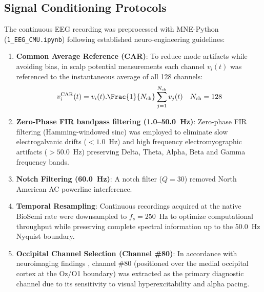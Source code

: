 \documentclass[12pt, a4paper]{report}
\begin{document}
\subsection{Signal Conditioning Protocols}
The continuous EEG recording was preprocessed with MNE-Python (\texttt{1\_EEG\_CMU.ipynb}) following established neuro-engineering guidelines:
\begin{enumerate}
    \item \textbf{Common Average Reference (CAR)}: To reduce mode artifacts while avoiding bias, in scalp potential measurements each channel $v_i(t)$ was referenced to the instantaneous average of all 128 channels:
    \begin{equation}
        v_i^{\text{CAR}}(t) = v_i(t). \Frac{1}{N_{\text{ch}}} \sum_{j=1}^{N_{\text{ch}}} v_j(t) \quad N_{\text{ch}} = 128
        \label{eq:car_reference}
    \end{equation}
    \item \textbf{Zero-Phase FIR bandpass filtering (1.0--50.0~Hz)}: Zero-phase FIR filtering (Hamming-windowed sinc) was employed to eliminate slow electrogalvanic drifts ($<1.0$~Hz) and high frequency electromyographic artifacts ($>50.0$~Hz) preserving Delta, Theta, Alpha, Beta and Gamma frequency bands.

    \item \textbf{Notch Filtering (60.0~Hz)}: A notch filter ($Q = 30$) removed North American AC powerline interference.
    \item \textbf{Temporal Resampling}: Continuous recordings acquired at the native BioSemi rate were downsampled to $f_s = 250$~Hz to optimize computational throughput while preserving complete spectral information up to the 50.0~Hz Nyquist boundary.
    \item \textbf{Occipital Channel Selection (Channel \#80)}: In accordance with neuroimaging findings \cite{chamanzar2021uhd,orhanbulucu2023hybrid}, channel \#80 (positioned over the medial occipital cortex at the Oz/O1 boundary) was extracted as the primary diagnostic channel due to its sensitivity to visual hyperexcitability and alpha pacing.
\end{enumerate}
\end{document}

